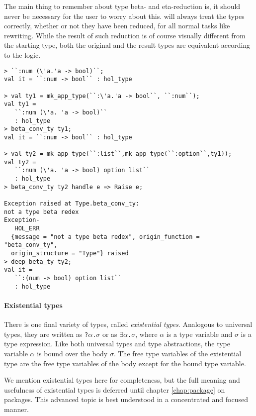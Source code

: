 The main thing to remember about type beta- and eta-reduction is, it should
never be necessary for the user to worry about this.  \HOLW{} will always
treat the types correctly, whether or not they have been reduced, for all
normal tasks like rewriting.
While the result of
such reduction is of course visually different from the starting type, both the
original and the result types are equivalent according to the \HOLW{} logic.
%
\begin{session}
\begin{verbatim}
> ``:num (\'a.'a -> bool)``;
val it = ``:num -> bool`` : hol_type

> val ty1 = mk_app_type(``:\'a.'a -> bool``, ``:num``);
val ty1 =
   ``:num (\'a. 'a -> bool)``
   : hol_type
> beta_conv_ty ty1;
val it = ``:num -> bool`` : hol_type

> val ty2 = mk_app_type(``:list``,mk_app_type(``:option``,ty1));
val ty2 =
   ``:num (\'a. 'a -> bool) option list``
   : hol_type
> beta_conv_ty ty2 handle e => Raise e;

Exception raised at Type.beta_conv_ty:
not a type beta redex
Exception-
   HOL_ERR
  {message = "not a type beta redex", origin_function = "beta_conv_ty",
  origin_structure = "Type"} raised
> deep_beta_ty ty2;
val it =
   ``:(num -> bool) option list``
   : hol_type
\end{verbatim}
\end{session}

\paragraph{Existential types}

There is one final variety of types, called {\it existential types}.
Analogous to universal types, they are written as
\texttt{?$\alpha$.$\sigma$} or as
\texttt{$\exists\alpha$.$\sigma$}, where $\alpha$ is a type variable
and $\sigma$ is a type expression. Like both universal types and
type abstractions, the type variable $\alpha$ is bound over the body
$\sigma$.  The free type variables of the existential type are the
free type variables of the body except for the bound type variable.

We mention existential types here for completeness, but the full meaning
and usefulness of existential types is deferred until 
chapter \ref{chap:package} on packages.
This advanced topic is best understood in a concentrated and focused manner.

